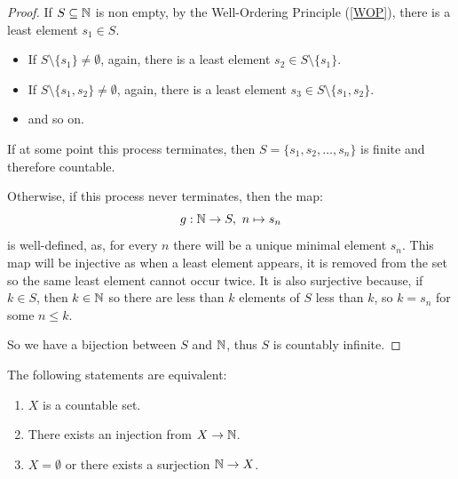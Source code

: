 \documentclass[../main.tex]{subfiles}
\begin{document}
\begin{proof}
  If $S \subseteq \mathbb{N}$ is non empty, by the Well-Ordering Principle (\cref{WOP}), there is a least element $s_1 \in S$.
  \begin{itemize}
    \item If $S \setminus \{s_1\} \neq \emptyset$, again, there is a least element $s_2 \in S \setminus \{s_1\}$.
    \item If $S \setminus \{s_1, s_2\} \neq \emptyset$, again, there is a least element $s_3 \in S \setminus \{s_1, s_2\}$.
    \item and so on.
  \end{itemize}
  If at some point this process terminates, then $S = \{s_1, s_2, \ldots, s_n\}$ is finite and therefore countable.

  Otherwise, if this process never terminates, then the map:
  \[
    g: \mathbb{N} \to S,\ n \mapsto s_n
  \]
  is well-defined, as, for every $n$ there will be a unique minimal element $s_n$.
  This map will be injective as when a least element appears, it is removed from the set so the same least element cannot occur twice.
  It is also surjective because, if $k \in S$, then $k \in \mathbb{N}$ so there are less than $k$ elements of $S$ less than $k$, so $k = s_n$ for some $n \leq k$.

  So we have a bijection between $S$ and $\mathbb{N}$, thus $S$ is countably infinite.
\end{proof}
\begin{theorem}
  The following statements are equivalent: \label{countabilityEquivalence}
  \begin{enumerate}
    \item $X$ is a countable set.
    \item There exists an injection from $X \to \mathbb{N}$.
    \item $X = \emptyset$ or there exists a surjection $\mathbb{N} \to X$.
  \end{enumerate}
\end{theorem}
\end{document}
